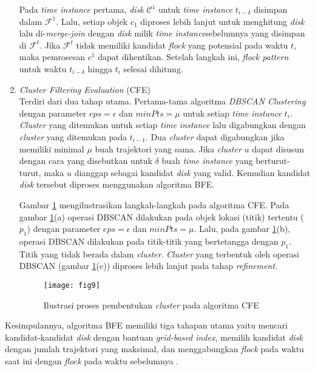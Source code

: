 \begin{enumerate}
\par Pada \textit{time instance} pertama, \textit{disk} $\mathcal{C}^1$ untuk \textit{time instance} $t_{i-\delta}$ disimpan dalam $\mathcal{F}^1$. Lalu, setiap objek $c_1$ diproses lebih lanjut untuk menghitung \textit{disk} lalu di-\textit{merge-join} dengan \textit{disk} milik \textit{time instance}sebelumnya yang disimpan di $\mathcal{F}^t$. Jika $\mathcal{F}^t$ tidak memiliki kandidat \textit{flock} yang potensial	pada waktu $t$, maka pemrosesan $c^1$ dapat dihentikan. Setelah langkah ini, \textit{flock pattern} untuk waktu $t_{i-\delta}$ hingga $t_i$ selesai dihitung. 


\item \textit{Cluster Filtering Evaluation} (CFE)\\
Terdiri dari dua tahap utama. Pertama-tama algoritma \textit{DBSCAN Clustering} dengan parameter $eps=\epsilon$ dan $minPts=\mu$ untuk setiap \textit{time instance} $t_i$. \textit{Cluster} yang ditemukan untuk setiap \textit{time instance} lalu digabungkan dengan \textit{cluster} yang ditemukan pada $t_{i-1}$. Dua \textit{cluster} dapat digabungkan jika memiliki minimal $\mu$ buah trajektori yang sama. Jika \textit{cluster} $u$ dapat disusun dengan cara yang disebutkan untuk $\delta$ buah \textit{time instance} yang berturut-turut, maka $u$ dianggap sebagai kandidat \textit{disk} yang valid. Kemudian kandidat \textit{disk} tersebut diproses menggunakan algoritma BFE.

\par Gambar \ref{fig:fig9} mengilustrasikan langkah-langkah pada algoritma CFE. Pada gambar \ref{fig:fig9}(a) operasi DBSCAN dilakukan pada objek lokasi (titik) tertentu ($p_1$) dengan parameter $eps=\epsilon$ dan $minPts=\mu$. Lalu, pada gambar \ref{fig:fig9}(b), operasi DBSCAN dilakukan pada titik-titik yang bertetangga dengan $p_1$. Titik yang tidak berada dalam \textit{cluster}. \textit{Cluster} yang terbentuk oleh operasi DBSCAN (gambar \ref{fig:fig9}(c)) diproses lebih lanjut pada tahap \textit{refinement}.

\begin{figure}[H]
	\centering  
	\texttt{[image: fig9]}  
	\caption{Ilustrasi proses pembentukan \textit{cluster} pada algoritma CFE} 
	\label{fig:fig9} 
\end{figure} 

\end{enumerate}

\par Kesimpulannya, algoritma BFE memiliki tiga tahapan utama yaitu mencari kandidat-kandidat \textit{disk} dengan bantuan \textit{grid-based index}, memilih kandidat \textit{disk} dengan jumlah trajektori yang maksimal, dan menggabungkan \textit{flock} pada waktu saat ini dengan \textit{flock} pada waktu sebelumnya \cite{flock_pattern_1:16}.
 
